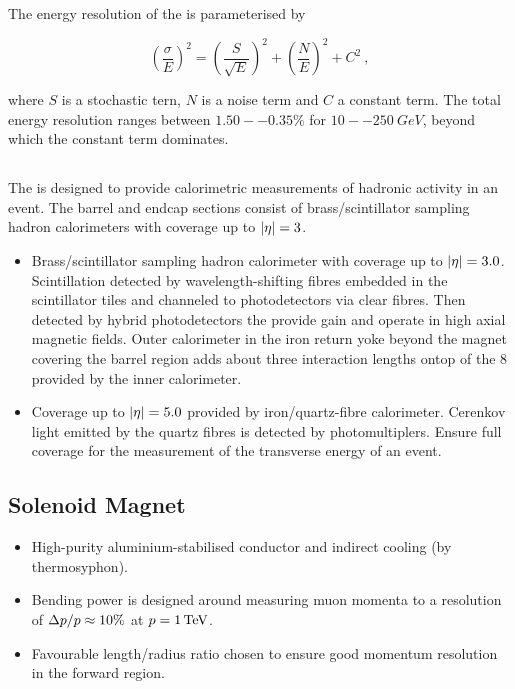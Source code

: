 The energy resolution of the \ECAL is parameterised by

\begin{equation}
    \left(\frac{\sigma}{E}\right)^{2} = \left(\frac{S}{\sqrt{E}} \right)^{2}
    + \left( \frac{N}{E} \right)^{2} + C^2\ ,
\end{equation}

where $S$ is a stochastic tern, $N$ is a noise term and $C$ a constant term.
The total energy resolution ranges between ${1.50--0.35\%}$ for
${10--\SI{250}{GeV}}$, beyond which the constant term dominates.

\subsection{\HCAL}

The \HCAL is designed to provide calorimetric measurements of hadronic activity
in an event. The barrel and endcap sections consist of brass/scintillator
sampling hadron calorimeters with coverage up to ${|\eta|=3}$.

\begin{itemize}
    \item Brass/scintillator sampling hadron calorimeter with coverage up to
        ${|\eta|=3.0}$. Scintillation detected by wavelength-shifting fibres
        embedded in the scintillator tiles and channeled to photodetectors
        via clear fibres. Then detected by hybrid photodetectors the provide
        gain and operate in high axial magnetic fields. Outer calorimeter
        in the iron return yoke beyond the magnet covering the barrel region
        adds about three interaction lengths ontop of the 8 provided by the
        inner calorimeter.
    \item Coverage up to ${|\eta|=5.0}$ provided by iron/quartz-fibre
        calorimeter. Cerenkov light emitted by the quartz fibres is detected by
        photomultiplers. Ensure full coverage for the measurement of the
        transverse energy of an event.
\end{itemize}

\subsection{Solenoid Magnet}

\begin{itemize}
    \item High-purity aluminium-stabilised conductor and indirect cooling (by
        thermosyphon).
    \item Bending power is designed around measuring muon momenta to a
        resolution of ${\Delta p/p\approx 10\%}$ at ${p = \SI{1}{TeV}}$.
    \item Favourable length/radius ratio chosen to ensure good momentum
        resolution in the forward region.
\end{itemize}

